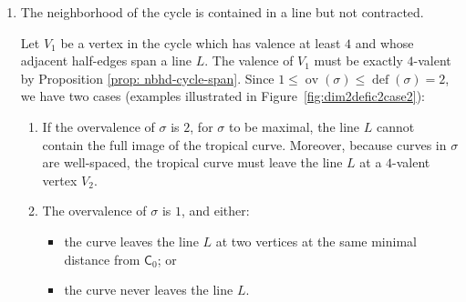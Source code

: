 \documentclass{article}
\def\Aut{{\rm Aut}}
\newcommand{\tropC}{\mathsf{C}}
\newcommand{\defic}[1]{\operatorname{def}(#1)}
\newcommand{\ov}[1]{\operatorname{ov}(#1)}
\newcommand{\nn}{n^{\operatorname{Aut}}}
\begin{document}
\begin{enumerate}
\begin{enumerate}
\begin{enumerate}[label=(\roman*)]
     Since $\ov{\sigma} \leq 2$, this is the only vertex $V$ with valency greater than $3$. Let $u_1, u_2$ be the direction vectors of any two distinct non-contracted half-edges adjacent to $V$. The region $P(\sigma)$ in Construction~\ref{const: polytope} is given as the parallelogram defined by $u_1, u_2$, with the line from $0$ to $u_1+u_2$ removed. The region $P(\sigma)$ has two triangles with the same number of lattice points in each. One of the triangles has vertices $0$, $u_1$, and $u_1+ u_2$. This is isometric to the dual polygon at the vertex $V$. Thus 
$$\nn(\sigma)  = \frac{i(P(\sigma))}{|\Aut(\sigma)|} = \frac{2 \times i(\text{dual polygon to $V$)}}{|\Aut(\sigma)|}.$$

    \item There are two $4$-valent vertices $V_1$, $V_2$ on the cycle each with two non-contracted half-edges adjacent to it. 

    Let $u_1$ (resp. $u_2$) be any non-contracted adjacent half-edge of $V_1$ (resp. $V_2$).  Theorem \ref{thm: calculation of weights} gives 
$$\nn(\sigma) = \frac{i(\text{parallelogram with vertices } 0,u_1, u_1+u_2, u_2)}{|\Aut(\sigma)|}$$
\end{enumerate}
 Examples for the cases 3.(a).(i) and 3.(a).(ii) are illustrated in Figure~\ref{fig:loopfivevalent}. 
    
    \item The neighborhood of the cycle is contained in a line but not contracted.

     Let $V_1$ be a vertex in the cycle which has valence at least $4$ and whose adjacent half-edges span a line $L$. The valence of $V_1$ must be exactly $4$-valent by Proposition \ref{prop: nbhd-cycle-span}. Since $1 \leq \ov{\sigma} \leq \defic{\sigma}=2$, we have two cases (examples illustrated in Figure~\ref{fig:dim2defic2case2}):
\begin{enumerate}[label=(\roman*)]
    \item If the overvalence of $\sigma$ is $2$, for $\sigma$ to be maximal, the line $L$ cannot contain the full image of the tropical curve. Moreover, because curves in $\sigma$ are well-spaced, the tropical curve must leave the line $L$ at a $4$-valent vertex $V_2$. 
    \item The overvalence of $\sigma$ is $1$, and either:
    \begin{itemize}
        \item the curve leaves the line $L$ at two vertices at the same minimal distance from $\tropC_0$; or
        \item the curve never leaves the line $L$. 
    \end{itemize}
    

\end{enumerate}
\end{enumerate}
\end{enumerate}
\end{document}
